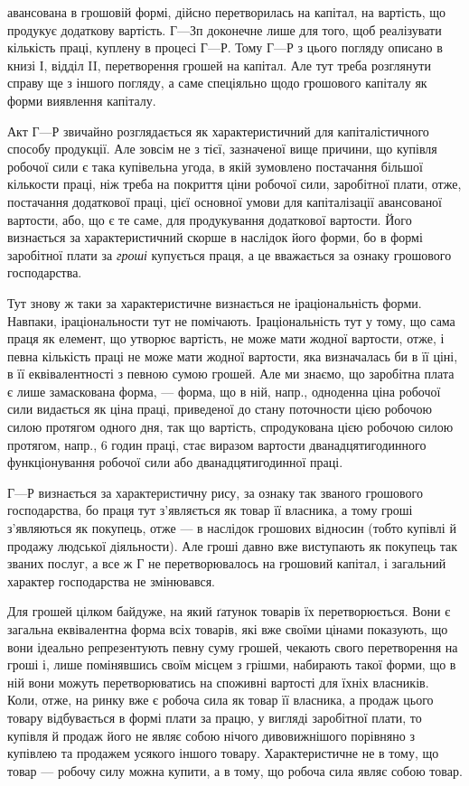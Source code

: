 \parcont{}  %
авансована в грошовій формі, дійсно перетворилась на капітал, на вартість,
що продукує додаткову вартість. $Г — Зп$ доконечне лише для того,
щоб реалізувати кількість праці, куплену в процесі $Г — Р$. Тому $Г — Р$
з цього погляду описано в книзі І, відділ II, перетворення грошей
на капітал. Але тут треба розглянути справу ще з іншого погляду,
а саме спеціяльно щодо грошового капіталу як форми виявлення капіталу.

Акт $Г — Р$ звичайно розглядається як характеристичний для капіталістичного
способу продукції. Але зовсім не з тієї, зазначеної вище причини,
що купівля робочої сили є така купівельна угода, в якій зумовлено
постачання більшої кількости праці, ніж треба на покриття ціни робочої
сили, заробітної плати, отже, постачання додаткової праці, цієї основної
умови для капіталізації авансованої вартости, або, що є те саме, для
продукування додаткової вартости. Його визнається за характеристичний
скорше в наслідок його форми, бо в формі заробітної плати за \emph{гроші}
купується праця, а це вважається за ознаку грошового господарства.

Тут знову ж таки за характеристичне визнається не іраціональність
форми. Навпаки, іраціональности тут не помічають. Іраціональність тут у
тому, що сама праця як елемент, що утворює вартість, не може мати
жодної вартости, отже, і певна кількість праці не може мати жодної
вартости, яка визначалась би в її ціні, в її еквівалентності з певною
сумою грошей. Але ми знаємо, що заробітна плата є лише замаскована
форма, — форма, що в ній, напр., одноденна ціна робочої сили видається
як ціна праці, приведеної до стану поточности цією робочою силою протягом
одного дня, так що вартість, спродукована цією робочою силою
протягом, напр., 6 годин праці, стає виразом вартости дванадцятигодинного
функціонування робочої сили або дванадцятигодинної праці.

$Г — Р$ визнається за характеристичну рису, за ознаку так званого грошового
господарства, бо праця тут з’являється як товар її власника, а тому
гроші з’являються як покупець, отже — в наслідок грошових відносин
(тобто купівлі й продажу людської діяльности). Але гроші давно вже
виступають як покупець так званих послуг, а все ж $Г$ не перетворювалось
на грошовий капітал, і загальний характер господарства не
змінювався.

Для грошей цілком байдуже, на який ґатунок товарів їх перетворюється.
Вони є загальна еквівалентна форма всіх товарів, які вже
своїми цінами показують, що вони ідеально репрезентують певну суму грошей,
чекають свого перетворення на гроші і, лише помінявшись своїм місцем
з грішми, набирають такої форми, що в ній вони можуть перетворюватись на
споживні вартості для їхніх власників. Коли, отже, на ринку вже є робоча
сила як товар її власника, а продаж цього товару відбувається в формі
плати за працю, у вигляді заробітної плати, то купівля й продаж його
не являє собою нічого дивовижнішого порівняно з купівлею та
продажем усякого іншого товару. Характеристичне не в тому, що товар
— робочу силу можна купити, а в тому, що робоча сила являє собою
товар.
